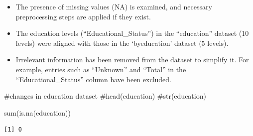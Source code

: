 \documentclass[
  11pt,
  a4paper,
  DIV=11,
  numbers=noendperiod]{scrartcl}
\newenvironment{Shaded}{\begin{snugshade}}{\end{snugshade}}
\newcommand{\CommentTok}[1]{\textcolor[rgb]{0.37,0.37,0.37}{#1}}
\newcommand{\FunctionTok}[1]{\textcolor[rgb]{0.28,0.35,0.67}{#1}}
\newcommand{\NormalTok}[1]{\textcolor[rgb]{0.00,0.23,0.31}{#1}}
\begin{document}
\begin{itemize}
\item
  The presence of missing values (NA) is examined, and necessary
  preprocessing steps are applied if they exist.
\item
  The education levels (``Educational\_Status'') in the ``education''
  dataset (10 levels) were aligned with those in the `byeducation'
  dataset (5 levels).
\item
  Irrelevant information has been removed from the dataset to simplify
  it. For example, entries such as ``Unknown'' and ``Total'' in the
  ``Educational\_Status'' column have been excluded.
\end{itemize}

\begin{Shaded}
\begin{Highlighting}[]
\CommentTok{\#changes in education dataset}
\CommentTok{\#head(education)}
\CommentTok{\#str(education)}

 \FunctionTok{sum}\NormalTok{(}\FunctionTok{is.na}\NormalTok{(education))}
\end{Highlighting}
\end{Shaded}

\begin{verbatim}
[1] 0
\end{verbatim}
\end{document}
